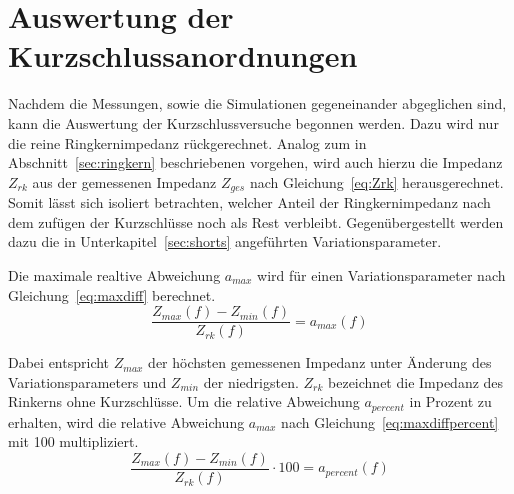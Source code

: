 \section{Auswertung der Kurzschlussanordnungen}
Nachdem die Messungen, sowie die Simulationen gegeneinander abgeglichen sind, kann die Auswertung der Kurzschlussversuche begonnen werden. Dazu wird nur die reine Ringkernimpedanz r\"uckgerechnet. Analog zum in Abschnitt~\ref{sec:ringkern} beschriebenen vorgehen, wird auch hierzu die Impedanz $Z_{rk}$ aus der gemessenen Impedanz $Z_{ges}$ nach Gleichung~\ref{eq:Zrk} herausgerechnet. Somit l\"asst sich isoliert betrachten, welcher Anteil der Ringkernimpedanz nach dem zuf\"ugen der Kurzschl\"usse noch als Rest verbleibt. Gegen\"ubergestellt werden dazu die in Unterkapitel~\ref{sec:shorts} angef\"uhrten Variationsparameter.
\par
Die maximale realtive Abweichung $a_{max}$ wird f\"ur einen Variationsparameter  nach Gleichung~\ref{eq:maxdiff} berechnet.
\begin{equation}
	\frac{Z_{max}(f) - Z_{min}(f)}{Z_{rk}(f)} = a_{max}(f)
	\label{eq:maxdiff}
\end{equation}
\par
Dabei entspricht $Z_{max}$ der h\"ochsten gemessenen Impedanz unter \"Anderung des Variationsparameters und $Z_{min}$ der niedrigsten. $Z_{rk}$ bezeichnet die Impedanz des Rinkerns ohne Kurzschl\"usse. Um die relative Abweichung $a_{percent}$ in Prozent zu erhalten, wird die relative Abweichung $a_{max}$ nach Gleichung~\ref{eq:maxdiffpercent} mit 100 multipliziert.
\begin{equation}
	\frac{Z_{max}(f) - Z_{min}(f)}{Z_{rk}(f)}\cdot 100 = a_{percent}(f)
	\label{eq:maxdiffpercent}
\end{equation}


